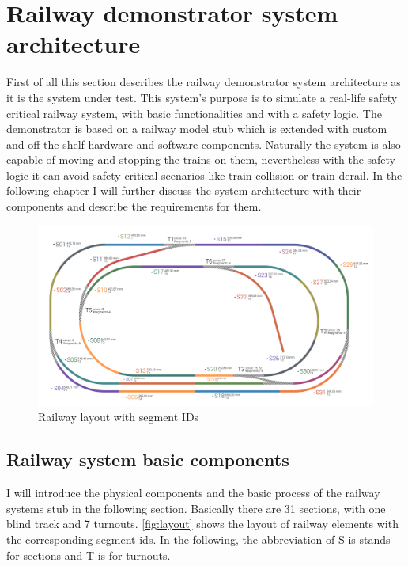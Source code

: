 \chapter{Railway demonstrator system architecture}\label{chapter:RailwaySystem}
First of all this section describes the railway demonstrator system architecture as it is the system under test. This system's purpose is to simulate a real-life safety critical railway system, with basic functionalities and with a safety logic. The demonstrator is based on a railway model stub which is extended with custom and off-the-shelf hardware and software components. Naturally the system is also capable of moving and stopping the trains on them, nevertheless with the safety logic it can avoid safety-critical scenarios like train collision or train derail. In the following chapter I will further discuss the system architecture with their components and describe the requirements for them.

\begin{figure}[ht]
	\centering
	\includegraphics[width=150mm, keepaspectratio]{figures/modes3/layoutBigsmall.png}
	\caption{Railway layout with segment IDs}
	\label{fig:layout}
\end{figure}

\section{Railway system basic components}
I will introduce the physical components and the basic process of the railway systems stub in the following section. Basically there are 31 sections, with one blind track and 7 turnouts. \autoref{fig:layout} shows the layout of railway elements with the corresponding segment ids. In the following, the abbreviation of S is stands for sections and T is for turnouts.

